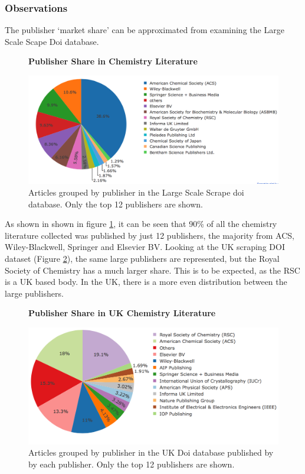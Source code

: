 \subsubsection{Observations}
\label{sec:CORPUSOBSERVATIONS}
The publisher `market share' can be approximated from examining the Large Scale Scape Doi database.
\begin{figure}[H]
    \centering
    \textbf{Publisher Share in Chemistry Literature}\par\medskip
    \includegraphics[width=\textwidth]{Data_Acquisition/publishers_pie.png}
    \caption{Articles grouped by publisher in the Large Scale Scrape doi database. Only the top 12 publishers are shown.}
     \label{fig:PUBPI}
\end{figure}
As shown in  shown in figure \ref{fig:PUBPI}, it can be seen that 90\% of all the chemistry literature collected was published by just 12 publishers, the majority from ACS, Wiley-Blackwell, Springer and Elsevier BV. Looking at the UK scraping DOI dataset (Figure \ref{fig:UKPUBPI}), the same large publishers are represented, but the Royal Society of Chemistry has a much larger share. This is to be expected, as the RSC is a UK based body. In the UK, there is a more even distribution between the large publishers. 

\begin{figure}[H]
    \centering
    \textbf{Publisher Share in UK Chemistry Literature}\par\medskip
    \includegraphics[width=\textwidth]{Data_Acquisition/uk_publishers_pie.png}
    \caption{Articles grouped by publisher in the UK Doi database published by by each publisher. Only the top 12 publishers are shown.}
     \label{fig:UKPUBPI}
\end{figure}

